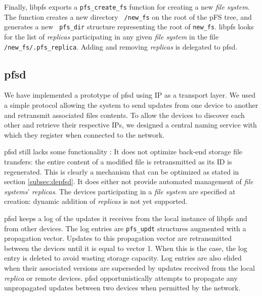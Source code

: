 
Finally, libpfs exports a {\tt pfs\_create\_fs} function for creating
a new \emph{file system}. The function creates a new directory {\tt
  /new\_fs} on the root of the pFS tree, and generates a new {\tt
  pfs\_dir} structure representing the root of {\tt new\_fs}. libpfs
looks for the list of \emph{replicas} participating in any given
\emph{file system} in the file {\tt /new\_fs/.pfs\_replica}. Adding
and removing \emph{replicas} is delegated to pfsd.


\subsection {pfsd}

We have implemented a prototype of pfsd using IP as a transport layer.
We used a simple protocol allowing the system to send updates from one
device to another and retransmit associated files contents. To allow
the devices to discover each other and retrieve their respective IPs,
we designed a central naming service with which they register when
connected to the network.

pfsd still lacks some functionality : It does not optimize
back-end storage file transfers: the entire content of a modified file
is retransmitted as its ID is regenerated. This is clearly a mechanism
that can be optimized as stated in section \ref{subsec:depfsd}. It
does either not provide automated management of \emph{file systems}'
\emph{replicas}. The devices participating in a \emph{file
  system} are specified at creation: dynamic addition of
\emph{replicas} is not yet supported.

pfsd keeps a log of the updates it receives from the local instance of
libpfs and from other devices. The log entries are {\tt pfs\_updt}
structures augmented with a propagation vector. Updates to this
propagation vector are retransmitted between the devices until it is
equal to vector 1.  When this is the case, the log entry is deleted to
avoid wasting storage capacity. Log entries are also elided when their
associated versions are superseded by updates received from the local
\emph{replica} or remote devices.  pfsd opportunistically attempts to
propagate any unpropagated updates between two devices when permitted
by the network.

